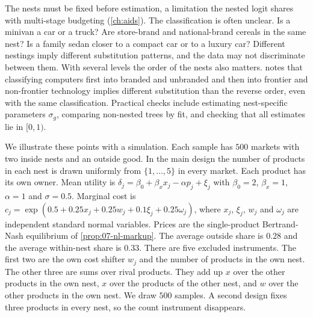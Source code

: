 The nests must be fixed before estimation, a limitation the nested logit shares with multi-stage budgeting
(\cref{ch:aids}). The classification is often unclear. Is a minivan a car or a truck? Are store-brand and
national-brand cereals in the same nest? Is a family sedan closer to a compact car or to a luxury car? Different
nestings imply different substitution patterns, and the data may not discriminate between them. With several
levels the order of the nests also matters. \citet[n.~18]{Nevo2000a} notes that classifying computers first into
branded and unbranded and then into frontier and non-frontier technology implies different substitution than the
reverse order, even with the same classification. Practical checks include estimating nest-specific parameters
$\sigma_g$, comparing non-nested trees by fit, and checking that all estimates lie in $[0, 1)$.

We illustrate these points with a simulation. Each sample has $500$ markets with two inside nests and an outside
good. In the main design the number of products in each nest is drawn uniformly from $\{1, \dots, 5\}$ in every
market. Each product has its own owner. Mean utility is $\delta_j = \beta_0 + \beta_xx_j - \alpha p_j + \xi_j$ with
$\beta_0 = 2$, $\beta_x = 1$, $\alpha = 1$ and $\sigma = 0.5$. Marginal cost is
$c_j = \exp(0.5 + 0.25x_j + 0.25w_j + 0.1\xi_j + 0.25\omega_j)$, where $x_j$, $\xi_j$, $w_j$ and $\omega_j$
are independent standard normal variables. Prices are the single-product Bertrand-Nash equilibrium of
\cref{prop:07-nl-markup}. The average outside share is $0.28$ and the average within-nest share is $0.33$. There
are five excluded instruments. The first two are the own cost shifter $w_j$ and the number of products in the own
nest. The other three are sums over rival products. They add up $x$ over the other products in the own nest, $x$
over the products of the other nest, and $w$ over the other products in the own nest. We draw $500$ samples. A second design fixes three products in every nest, so the count
instrument disappears.

